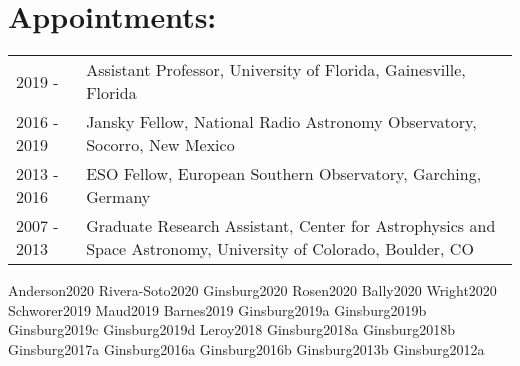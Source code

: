 \documentclass[12pt]{article}
\begin{document}
\section{Appointments:}
\begin{listliketab}
    \begin{tabular}{p{0.8in}p{6.2in}}
    2019 -      & Assistant Professor, University of Florida,  Gainesville, Florida \\
    2016 - 2019 & Jansky Fellow, National Radio Astronomy Observatory, Socorro, New Mexico \\
    2013 - 2016 & ESO Fellow, European Southern Observatory, Garching, Germany \\
    2007 - 2013  & Graduate Research Assistant, Center for Astrophysics and Space Astronomy, University of Colorado, Boulder, CO \\
    \end{tabular}
\end{listliketab}


%


%





\nocite{biba}{Anderson2020}
\nocite{biba}{Rivera-Soto2020}
\nocite{biba}{Ginsburg2020}
\nocite{biba}{Rosen2020}
\nocite{biba}{Bally2020}
\nocite{biba}{Wright2020}
\nocite{biba}{Schworer2019}
\nocite{biba}{Maud2019}
\nocite{biba}{Barnes2019}
\nocite{biba}{Ginsburg2019a}
\nocite{biba}{Ginsburg2019b}
\nocite{biba}{Ginsburg2019c}
\nocite{biba}{Ginsburg2019d}
\nocite{biba}{Leroy2018}
\nocite{biba}{Ginsburg2018a}
\nocite{biba}{Ginsburg2018b}
\nocite{biba}{Ginsburg2017a}
\nocite{biba}{Ginsburg2016a}
\nocite{biba}{Ginsburg2016b}
\nocite{biba}{Ginsburg2013b}
\nocite{biba}{Ginsburg2012a}
\end{document}
